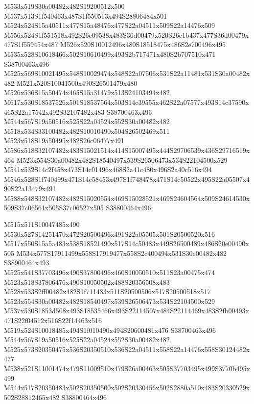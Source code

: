 \documentclass{article}
\begin{document}
\begin{multicols}{2}
M533x519S30a00482x482S19200512x500 M537x513S1f540463x487S1f550513x494S28806484x501 M524x524S15a40511x477S15a48476x477S22a04511x509S22a14476x509 M556x524S1f551518x492S26c09538x483S36d00479x520S26c1b437x477S36d00479x477S1f559454x487 M526x520S10012496x480S18518475x486S2e700496x495 M535x528S10618466x502S10610499x493S2b717471x480S2b707510x471 S38700463x496 M525x569S10021495x548S10029474x548S22a07506x531S22a11481x531S30a00482x482 M521x520S10041500x490S26501479x480 M526x536S15a50474x465S15a31479x513S24103494x482 M617x530S18537526x501S18537564x503S14c39555x462S22a07577x493S14c37590x465S22a17542x492S32107482x483 S38700463x496 M544x567S19a50516x525S22a04524x552S30a00482x482 M518x534S33100482x482S10010490x504S26502469x511 M523x518S19a50495x482S26c06477x491 M586x518S32107482x483S15021514x414S15007495x444S29706539x436S29716519x464 M523x554S30a00482x482S18540497x539S26506473x534S22104500x529 M541x532S14c2f458x473S14c01496x468S2a41c480x496S2a40c516x494 M546x528S1f740499x471S14c58453x497S1f748478x471S14c50522x495S22a05507x490S22a13479x491 M588x548S32107482x482S15020554x469S15028521x469S24604564x509S24614530x509S37c06561x505S37c06527x505 S38800464x496

M515x511S10047485x490 M530x527S14251470x472S20500496x491S22a05505x501S20500520x516 M517x550S15a5a483x538S18521490x517S14c50483x449S26500489x486S20e00490x505 M534x577S17911499x558S17919477x558S2c400494x531S30e00482x482 S38900464x493 M525x541S37703496x490S37800496x460S10050510x511S23a00475x474 M523x518S37806476x490S10050502x488S20356508x483 M528x533S2ff00482x482S1f711483x511S20500506x517S20500518x517 M523x554S30a00482x482S18540497x539S26506473x534S22104500x529 M537x530S1853d508x493S18535466x493S22114507x484S22114469x483S2fb00493x471S22f04512x516S22f14463x516 M519x524S10018485x494S1f010490x494S20600481x476 S38700463x496 M544x567S19a50516x525S22a04524x552S30a00482x482 M525x573S20350475x536S20350510x536S22a04511x558S22a14476x558S30124482x477 M538x521S11001474x479S11009510x479S26a00463x505S37703495x499S3770b495x499 M544x517S20350483x502S20350500x502S20330456x502S2880a510x483S20330529x502S28812465x482 S38800464x496


\end{multicols}
\end{document}
